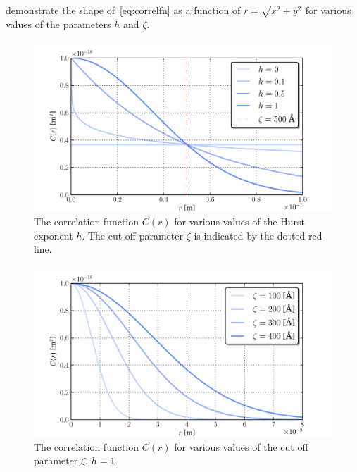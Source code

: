 \documentclass[10pt,twoside, b5paper,pdftex]{report}
\begin{document}
 demonstrate the shape of~\cref{eq:correlfn} as a function of $r = \sqrt{x^2 + y^2}$ for various values of the parameters $h$ and $\zeta$. 
\begin{figure}[htbp]
	\begin{center}
		\includegraphics[width=\textwidth]{figures/corrfn.pdf}		
	\end{center}
	\caption{The correlation function $C(r)$ for various values of the Hurst exponent $h$. The cut off parameter $\zeta$ is indicated by the dotted red line.\label{fig:corrfn}}
\end{figure}
\begin{figure}[htbp]
	\begin{center}
		\includegraphics[width=\textwidth]{figures/corrfnzeta.pdf}		
	\end{center}
	\caption{The correlation function $C(r)$ for various values of the cut off parameter $\zeta$. $h = 1$. \label{fig:corrfnzeta}}
\end{figure}
\end{document}
